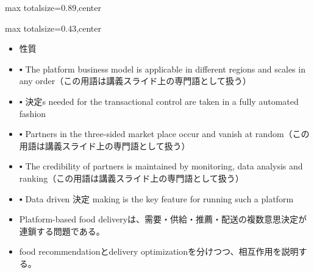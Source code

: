 \begin{minipage}[t]{0.58\textwidth}
\begin{adjustbox}{max totalsize={\textwidth}{0.89\textheight},center}
\begin{minipage}{\textwidth}
\end{minipage}
\end{adjustbox}
\end{minipage}


\clearpage
{}
\begin{minipage}[t]{0.405\textwidth}
\begin{adjustbox}{max totalsize={\textwidth}{0.43\textheight},center}
\begin{minipage}{\textwidth}\scriptsize
{}\begin{itemize}
\item 性質
\item ▪ The platform business model is applicable in different regions and scales in any order（この用語は講義スライド上の専門語として扱う）
\item ▪ 決定s needed for the transactional control are taken in a fully automated fashion
\item ▪ Partners in the three-sided market place occur and vanish at random（この用語は講義スライド上の専門語として扱う）
\item ▪ The credibility of partners is maintained by monitoring, data analysis and ranking（この用語は講義スライド上の専門語として扱う）
\item ▪ Data driven 決定 making is the key feature for running such a platform
\end{itemize}\begin{itemize}
\item Platform-based food deliveryは、需要・供給・推薦・配送の複数意思決定が連鎖する問題である。
\item food recommendationとdelivery optimizationを分けつつ、相互作用を説明する。
\end{itemize}
\end{minipage}
\end{adjustbox}
\end{minipage}\hfill
